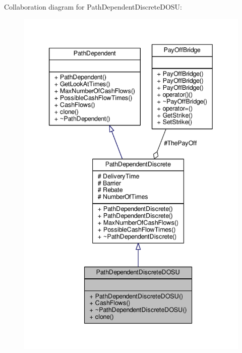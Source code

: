 Collaboration diagram for Path\+Dependent\+Discrete\+D\+O\+SU\+:
\nopagebreak
\begin{figure}[H]
\begin{center}
\leavevmode
\includegraphics[width=340pt]{classPathDependentDiscreteDOSU__coll__graph}
\end{center}
\end{figure}
